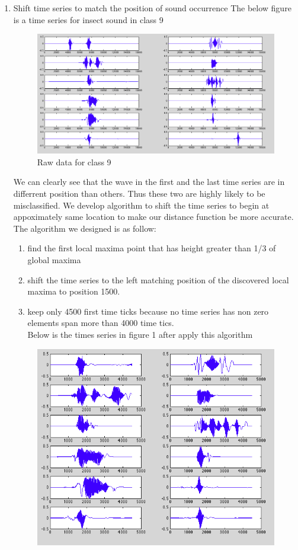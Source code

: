 \begin{enumerate}
\item Shift time series to match the position of sound occurrence
The below figure is a time series for insect sound in class 9
\begin{figure}[H]
\includegraphics[scale=.4]{PIC/class9raw.png}
\caption{Raw data for class 9}
\end{figure}
We can clearly see that the wave in the first and the last time series are in differrent position than others. Thus these two are highly likely to be misclassified. We develop algorithm to shift the time series to begin at appoximately same location to make our distance function be more accurate.
The algorithm we designed is as follow:
\begin{enumerate}
\item find the first local maxima point that has height greater than 1/3 of global maxima
\item shift the time series to the left matching position of the discovered local maxima to position 1500.
\item keep only 4500 first time ticks because no time series has non zero elements span more than 4000 time tics.\\
Below is the times series in figure 1 after apply this algorithm
\end{enumerate}
\begin{figure}[H]
\centering
\includegraphics[scale=.4]{PIC/class9shift.png}

\end{figure}
\end{enumerate}
